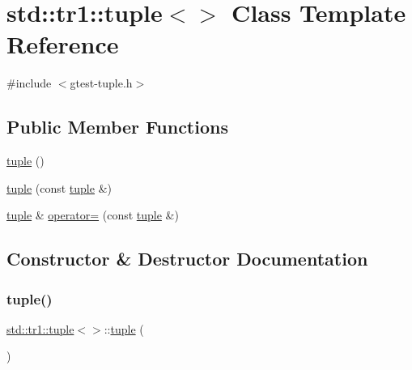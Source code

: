 \hypertarget{classstd_1_1tr1_1_1tuple_3_4}{}\section{std\+:\+:tr1\+:\+:tuple$<$$>$ Class Template Reference}
\label{classstd_1_1tr1_1_1tuple_3_4}


{\ttfamily \#include $<$gtest-\/tuple.\+h$>$}

\subsection*{Public Member Functions}
\begin{DoxyCompactItemize}
\item 
\hyperlink{classstd_1_1tr1_1_1tuple_3_4_adcea1a41d0521157971339d279aad469}{tuple} ()
\item 
\hyperlink{classstd_1_1tr1_1_1tuple_3_4_aa857599acb126134e29dc5e53fd9d1a7}{tuple} (const \hyperlink{classstd_1_1tr1_1_1tuple}{tuple} \&)
\item 
\hyperlink{classstd_1_1tr1_1_1tuple}{tuple} \& \hyperlink{classstd_1_1tr1_1_1tuple_3_4_a93ddab6f662662fc49635608619150c8}{operator=} (const \hyperlink{classstd_1_1tr1_1_1tuple}{tuple} \&)
\end{DoxyCompactItemize}


\subsection{Constructor \& Destructor Documentation}
\mbox{\label{classstd_1_1tr1_1_1tuple_3_4_adcea1a41d0521157971339d279aad469}} 
\subsubsection{\texorpdfstring{tuple()}{tuple()}\hspace{0.1cm}{\footnotesize\ttfamily [1/2]}}
{\footnotesize\ttfamily \hyperlink{classstd_1_1tr1_1_1tuple}{std\+::tr1\+::tuple}$<$$>$\+::\hyperlink{classstd_1_1tr1_1_1tuple}{tuple} (\begin{DoxyParamCaption}{ }\end{DoxyParamCaption})\hspace{0.3cm}{\ttfamily [inline]}}

